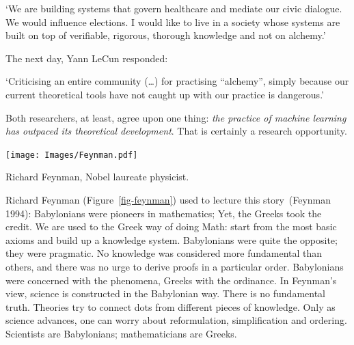 \documentclass[
  letterpaper,
  12pt,
  british]{tufte-book}
\renewenvironment{quote}{
  \list{}{\leftmargin=3.5cm\topsep=0pt}
  \item\relax\small\itshape
}
{\endlist}
\theoremstyle{plain}
\theoremstyle{definition}
\theoremstyle{plain}
\theoremstyle{remark}
\begin{document}
\begin{quote}
`We are building systems that govern healthcare and mediate our civic
dialogue. We would influence elections. I would like to live in a
society whose systems are built on top of verifiable, rigorous, thorough
knowledge and not on alchemy.'
\end{quote}

The next day, Yann LeCun responded:

\begin{quote}
`Criticising an entire community (\ldots) for practising ``alchemy'',
simply because our current theoretical tools have not caught up with our
practice is dangerous.'
\end{quote}

Both researchers, at least, agree upon one thing: \emph{the practice of
machine learning has outpaced its theoretical development}. That is
certainly a research opportunity.

\begin{marginfigure}

{\centering \texttt{[image: Images/Feynman.pdf]}

}

\caption{\label{fig-feynman}Richard Feynman, Nobel laureate physicist.}

\end{marginfigure}

Richard Feynman (Figure~\ref{fig-feynman}) used to lecture this
story~(Feynman
1994):
Babylonians were pioneers in mathematics; Yet, the Greeks took the
credit. We are used to the Greek way of doing Math: start from the most
basic axioms and build up a knowledge system. Babylonians were quite the
opposite; they were pragmatic. No knowledge was considered more
fundamental than others, and there was no urge to derive proofs in a
particular order. Babylonians were concerned with the phenomena, Greeks
with the ordinance. In Feynman's view, science is constructed in the
Babylonian way. There is no fundamental truth. Theories try to connect
dots from different pieces of knowledge. Only as science advances, one
can worry about reformulation, simplification and ordering. Scientists
are Babylonians; mathematicians are Greeks.
\end{document}
